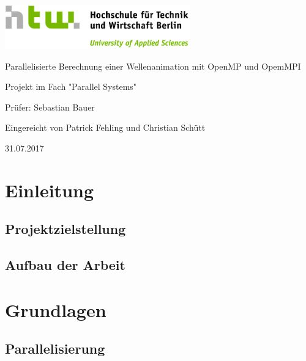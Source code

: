 \documentclass[12pt,a4paper,ngerman]{article}
\begin{document}
\begin{titlepage}
\thispagestyle{empty}

\begin{center}
	\includegraphics[width=0.6\textwidth]{pictures/HTW_Logo}
	
	\vspace{2cm}
	
	\Huge 
	Parallelisierte Berechnung einer Wellenanimation mit OpenMP und OpemMPI
	
	\vspace{2cm}
	\large
	Projekt im Fach "Parallel Systems"
	
	\vspace{2cm}
	
	Prüfer: Sebastian Bauer
	
	\vspace{0.5cm}
	
	Eingereicht von Patrick Fehling und Christian Schütt
	
	\vspace{0.5cm}
	
	31.07.2017
\end{center}


\end{titlepage}

\pagestyle{empty}

\tableofcontents
\setcounter{page}{0}

\clearpage{}
\pagestyle{fancy}


\section{Einleitung}
\subsection{Projektzielstellung}
\subsection{Aufbau der Arbeit}

\section{Grundlagen}
\subsection{Parallelisierung}
\end{document}

